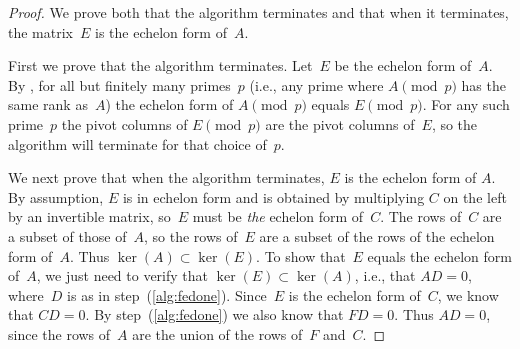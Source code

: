 \begin{proof}
  We prove both that the algorithm terminates and that when it
  terminates, the matrix~$E$ is the echelon form of~$A$.  

  First we prove that the algorithm terminates.  Let~$E$ be the
  echelon form of~$A$. 
  By , 
  for all but finitely many primes~$p$ (i.e., any
  prime where $A\pmod{p}$ has the same rank as~$A$) the echelon form of
  $A\pmod{p}$ equals $E\pmod{p}$.  For any such prime~$p$ the pivot
  columns of $E\pmod{p}$ are the pivot columns of~$E$, so the
  algorithm will terminate for that choice of~$p$.

  We next prove that when the algorithm terminates, $E$ is the
  echelon form of $A$.  By assumption, $E$ is in echelon form and is
  obtained by multiplying $C$ on the left by an invertible matrix,
  so~$E$ must be {\em the} echelon form of~$C$.  The rows of~$C$ are a
  subset of those of~$A$, so the rows of~$E$ are a subset of the rows
  of the echelon form of~$A$.  Thus $\ker(A) \subset \ker(E)$.  To
  show that~$E$ equals the echelon form of~$A$, we just need to verify
  that $\ker(E)\subset \ker(A)$, i.e., that $AD=0$, where~$D$ is as in
  step~(\ref{alg:fedone}).  Since~$E$ is the echelon form of~$C$, we
  know that $CD=0$.  By step~(\ref{alg:fedone}) we also know that
  $FD=0$.  Thus $AD=0$, since the rows of~$A$ are the union of the
  rows of~$F$ and~$C$.

\end{proof}



